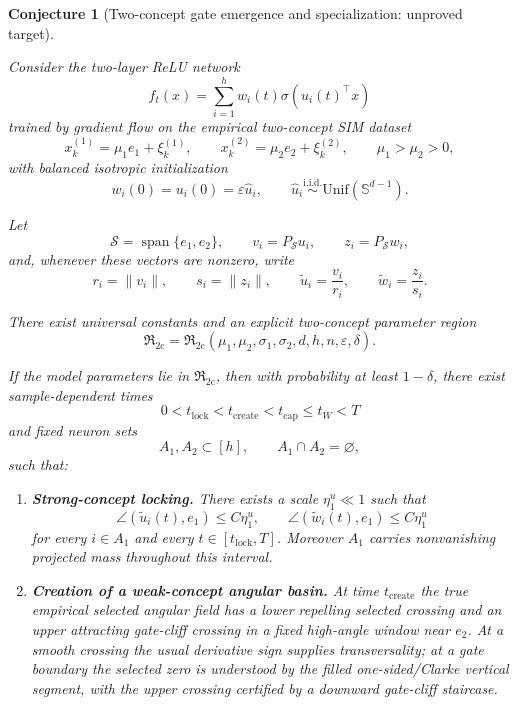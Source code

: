 \documentclass{article} %
\theoremstyle{plain}
\newtheorem{conjecture}[theorem]{Conjecture}
\theoremstyle{definition}
\theoremstyle{remark}
\begin{document}
\begin{conjecture}[Two-concept gate emergence and specialization: unproved target]
\label{thm:two-concept-specialization}

Consider the two-layer ReLU network
\[
f_t(x)
=
\sum_{i=1}^h
w_i(t)\sigma(u_i(t)^\top x)
\]
trained by gradient flow on the empirical two-concept SIM dataset
\[
x_k^{(1)}=\mu_1 e_1+\xi_k^{(1)},
\qquad
x_k^{(2)}=\mu_2 e_2+\xi_k^{(2)},
\qquad
\mu_1>\mu_2>0,
\]
with balanced isotropic initialization
\[
w_i(0)=u_i(0)=\varepsilon \widehat u_i,
\qquad
\widehat u_i\stackrel{\mathrm{i.i.d.}}{\sim}\mathrm{Unif}(\mathbb S^{d-1}).
\]

Let
\[
\mathcal S=\operatorname{span}\{e_1,e_2\},
\qquad
v_i=P_{\mathcal S}u_i,
\qquad
z_i=P_{\mathcal S}w_i,
\]
and, whenever these vectors are nonzero, write
\[
r_i=\|v_i\|,
\qquad
s_i=\|z_i\|,
\qquad
\widetilde u_i=\frac{v_i}{r_i},
\qquad
\widetilde w_i=\frac{z_i}{s_i}.
\]

There exist universal constants and an explicit two-concept
parameter region
\[
\boxed{
\mathfrak R_{\mathrm{2c}}
=
\mathfrak R_{\mathrm{2c}}
\left(
\mu_1,\mu_2,\sigma_1,\sigma_2,
d,h,n,\varepsilon,\delta
\right).
}
\]

If the model parameters lie in
\(\mathfrak R_{\mathrm{2c}}\), then with probability at least
\(1-\delta\), there exist sample-dependent times
\[
0<t_{\mathrm{lock}}
<
t_{\mathrm{create}}
<
t_{\mathrm{cap}}
\le
t_W
<
T
\]
and fixed neuron sets
\[
A_1,A_2\subset[h],
\qquad
A_1\cap A_2=\varnothing,
\]
such that:

\begin{enumerate}[label=\textnormal{(\roman*)}]

\item
\textbf{Strong-concept locking.}
There exists a scale \(\eta_1^u\ll1\) such that
\[
\angle(\widetilde u_i(t),e_1)
\le
C\eta_1^u,
\qquad
\angle(\widetilde w_i(t),e_1)
\le
C\eta_1^u
\]
for every \(i\in A_1\) and every
\(t\in[t_{\mathrm{lock}},T]\).
Moreover \(A_1\) carries nonvanishing projected mass throughout this
interval.

\item
\textbf{Creation of a weak-concept angular basin.}
At time $t_{\mathrm{create}}$ the true empirical selected angular field has a
lower repelling selected crossing and an upper attracting gate-cliff crossing
in a fixed high-angle window near $e_2$. At a smooth crossing the usual
derivative sign supplies transversality; at a gate boundary the selected zero
is understood by the filled one-sided/Clarke vertical segment, with the upper
crossing certified by a downward gate-cliff staircase.


\end{enumerate}
\end{conjecture}
\end{document}
